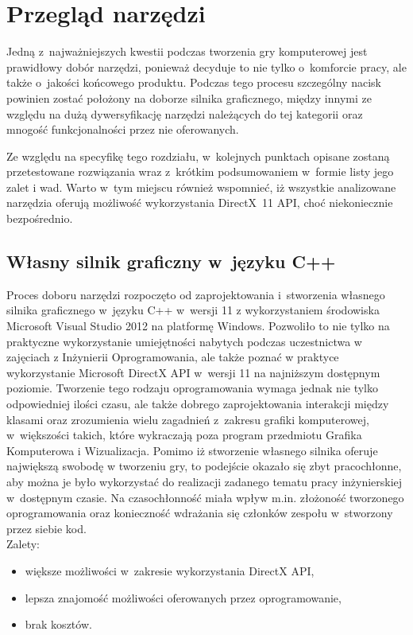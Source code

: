 
\chapter{Przegląd narzędzi}
Jedną z~najważniejszych kwestii podczas tworzenia gry komputerowej jest prawidłowy dobór narzędzi, ponieważ decyduje to nie tylko o~komforcie pracy, ale także o~jakości końcowego produktu. Podczas tego procesu szczególny nacisk powinien zostać położony na doborze silnika graficznego, między innymi ze względu na dużą dywersyfikację narzędzi należących do tej kategorii oraz mnogość funkcjonalności przez nie oferowanych.

Ze względu na specyfikę tego rozdziału, w~kolejnych punktach opisane zostaną przetestowane rozwiązania wraz z~krótkim podsumowaniem w~formie listy jego zalet i wad. Warto w~tym miejscu również wspomnieć, iż wszystkie analizowane narzędzia oferują możliwość wykorzystania DirectX~11 API, choć niekoniecznie bezpośrednio.

\section{Własny silnik graficzny w~języku C++}
Proces doboru narzędzi rozpoczęto od zaprojektowania i~stworzenia własnego silnika graficznego w~języku C++ w~wersji 11 z wykorzystaniem środowiska Microsoft Visual Studio 2012 na platformę Windows. Pozwoliło to nie tylko na praktyczne wykorzystanie umiejętności nabytych podczas uczestnictwa w zajęciach z Inżynierii Oprogramowania, ale także poznać w praktyce wykorzystanie Microsoft DirectX API w~wersji 11 na najniższym dostępnym poziomie. Tworzenie tego rodzaju oprogramowania wymaga jednak nie tylko odpowiedniej ilości czasu, ale także dobrego zaprojektowania interakcji między klasami oraz zrozumienia wielu zagadnień z~zakresu grafiki komputerowej, w~większości takich, które wykraczają poza program przedmiotu Grafika Komputerowa i Wizualizacja.
Pomimo iż stworzenie własnego silnika oferuje największą swobodę w tworzeniu gry, to podejście okazało się zbyt pracochłonne, aby można je było wykorzystać do realizacji zadanego tematu pracy inżynierskiej w~dostępnym czasie. Na czasochłonność miała wpływ m.in. złożoność tworzonego oprogramowania oraz konieczność wdrażania się członków zespołu w~stworzony przez siebie kod.\\

Zalety:
\begin{itemize}
\item większe możliwości w~zakresie wykorzystania DirectX API,
\item lepsza znajomość możliwości oferowanych przez oprogramowanie,
\item brak kosztów.
\end{itemize}

